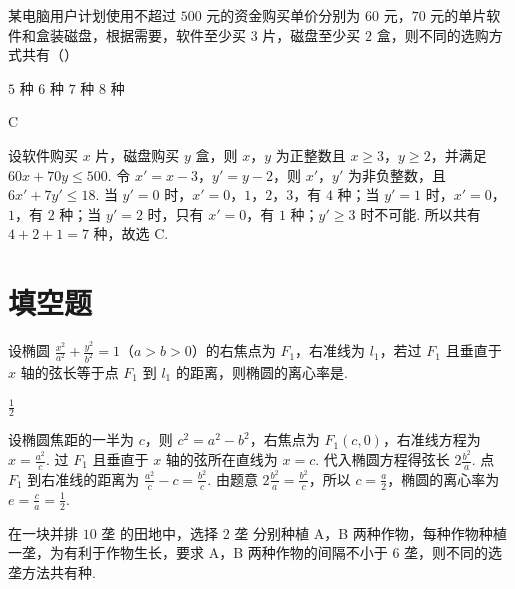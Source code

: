 \documentclass[UTF8,a4paper,oneside,11pt]{ctexbook}
\begin{document}
\begin{problem}
某电脑用户计划使用不超过 \(500\) 元的资金购买单价分别为 \(60\) 元，\(70\) 元的单片软件和盒装磁盘，根据需要，软件至少买 \(3\) 片，磁盘至少买 \(2\) 盒，则不同的选购方式共有（\quad）

\choices
    {\(5\text{ 种}\)}
    {\(6\text{ 种}\)}
    {\(7\text{ 种}\)}
    {\(8\text{ 种}\)}
\end{problem}

\begin{answer}
C
\end{answer}

\begin{solution}
设软件购买 \(x\) 片，磁盘购买 \(y\) 盒，则 \(x\)，\(y\) 为正整数且 \(x\geqslant3\)，\(y\geqslant2\)，并满足
\(60x+70y\leqslant500\).
令 \(x'=x-3\)，\(y'=y-2\)，则 \(x'\)，\(y'\) 为非负整数，且
\(6x'+7y'\leqslant18\).
当 \(y'=0\) 时，\(x'=0\)，\(1\)，\(2\)，\(3\)，有 \(4\) 种；当 \(y'=1\) 时，\(x'=0\)，\(1\)，有 \(2\) 种；当 \(y'=2\) 时，只有 \(x'=0\)，有 \(1\) 种；\(y'\geqslant3\) 时不可能. 所以共有 \(4+2+1=7\) 种，故选 C.
\end{solution}

\section{填空题}

\begin{problem}
设椭圆 \(\frac{x^2}{a^2}+\frac{y^2}{b^2}=1\)（\(a>b>0\)）的右焦点为 \(F_1\)，右准线为 \(l_1\)，若过 \(F_1\) 且垂直于 \(x\) 轴的弦长等于点 \(F_1\) 到 \(l_1\) 的距离，则椭圆的离心率是\fillinblank{}.
\end{problem}

\begin{answer}
\(\frac{1}{2}\)
\end{answer}

\begin{solution}
设椭圆焦距的一半为 \(c\)，则 \(c^2=a^2-b^2\)，右焦点为 \(F_1(c,0)\)，右准线方程为 \(x=\frac{a^2}{c}\).
过 \(F_1\) 且垂直于 \(x\) 轴的弦所在直线为 \(x=c\). 代入椭圆方程得弦长
\(2\frac{b^2}{a}\). 点 \(F_1\) 到右准线的距离为
\(\frac{a^2}{c}-c=\frac{b^2}{c}\).
由题意 \(2\frac{b^2}{a}=\frac{b^2}{c}\)，所以 \(c=\frac{a}{2}\)，椭圆的离心率为 \(e=\frac{c}{a}=\frac{1}{2}\).
\end{solution}

\begin{problem}
在一块并排 \(10\text{ 垄}\) 的田地中，选择 \(2\text{ 垄}\) 分别种植 A，B 两种作物，每种作物种植一垄，为有利于作物生长，要求 A，B 两种作物的间隔不小于 \(6\text{ 垄}\)，则不同的选垄方法共有\fillinblank{}\(\text{种}\).
\end{problem}
\end{document}
